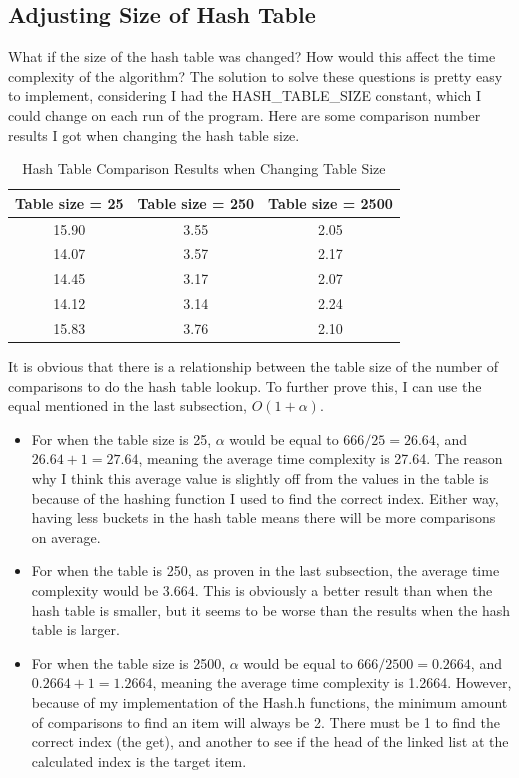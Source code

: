 \documentclass[letterpaper, 10pt]{article}
\begin{document}
\subsection{Adjusting Size of Hash Table}
\noindent
What if the size of the hash table was changed? How would this affect the time complexity of the algorithm? The solution to solve these questions is pretty easy to implement, considering I had the HASH\_TABLE\_SIZE constant, which I could change on each run of the program. Here are some comparison number results I got when changing the hash table size. 

\vspace{-1em}
\begin{table}[H]
    \centering
    \begin{tabular}{|c|c|c|}
        \hline
        \textbf{Table size = 25} & \textbf{Table size = 250} & \textbf{Table size = 2500} \\
        \hline
        15.90 & 3.55 & 2.05 \\
        14.07 & 3.57 & 2.17 \\
        14.45 & 3.17 & 2.07 \\
        14.12 & 3.14 & 2.24 \\
        15.83 & 3.76 & 2.10 \\
        \hline
    \end{tabular}
    \caption{Hash Table Comparison Results when Changing Table Size}
    \label{tab:tab4}
\end{table}

\noindent
It is obvious that there is a relationship between the table size of the number of comparisons to do the hash table lookup. To further prove this, I can use the equal mentioned in the last subsection, $O(1 + \alpha)$.

\begin{itemize}
    \item For when the table size is 25, $\alpha$ would be equal to $666/25 = 26.64$, and $26.64 + 1 = 27.64$, meaning the average time complexity is 27.64. The reason why I think this average value is slightly off from the values in the table is because of the hashing function I used to find the correct index. Either way, having less buckets in the hash table means there will be more comparisons on average.
    \item For when the table is 250, as proven in the last subsection, the average time complexity would be 3.664. This is obviously a better result than when the hash table is smaller, but it seems to be worse than the results when the hash table is larger.
    \item For when the table size is 2500, $\alpha$ would be equal to $666/2500 = 0.2664$, and $0.2664 + 1 = 1.2664$, meaning the average time complexity is 1.2664. However, because of my implementation of the Hash.h functions, the minimum amount of comparisons to find an item will always be 2. There must be 1 to find the correct index (the get), and another to see if the head of the linked list at the calculated index is the target item. 
\end{itemize}
\end{document}
